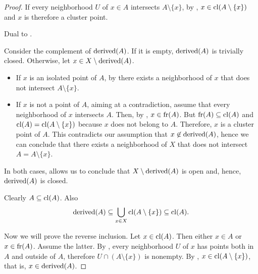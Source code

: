 \begin{proof}
   If every neighborhood \( U \) of \( x \in A \) intersects \( A \setminus \{ x \} \), by , \( x \in \operatorname{cl}(A \setminus \{ x \}) \) and \( x \) is therefore a cluster point.

   Dual to .

   Consider the complement of \( \operatorname{derived}(A) \). If it is empty, \( \operatorname{derived}(A) \) is trivially closed. Otherwise, let \( x \in X \setminus \operatorname{derived}(A) \).

  \begin{itemize}
    \item If \( x \) is an isolated point of \( A \), by  there exists a neighborhood of \( x \) that does not intersect \( A \setminus \{ x \} \).
    \item If \( x \) is not a point of \( A \), aiming at a contradiction, assume that every neighborhood of \( x \) intersects \( A \). Then, by , \( x \in \operatorname{fr}(A) \). But \( \operatorname{fr}(A) \subseteq \operatorname{cl}(A) \) and \( \operatorname{cl}(A) = \operatorname{cl}(A \setminus \{ x \}) \) because \( x \) does not belong to \( A \). Therefore, \( x \) is a cluster point of \( A \). This contradicts our assumption that \( x \not\in \operatorname{derived}(A) \), hence we can conclude that there exists a neighborhood of \( X \) that does not intersect \( A = A \setminus \{ x \} \).
  \end{itemize}

  In both cases,  allows us to conclude that \( X \setminus \operatorname{derived}(A) \) is open and, hence, \( \operatorname{derived}(A) \) is closed.

   Clearly \( A \subseteq \operatorname{cl}(A) \). Also
  \begin{equation*}
    \operatorname{derived}(A) \subseteq \bigcup_{x \in X} \operatorname{cl}(A \setminus \{ x \}) \subseteq \operatorname{cl}(A).
  \end{equation*}

  Now we will prove the reverse inclusion. Let \( x \in \operatorname{cl}(A) \). Then either \( x \in A \) or \( x \in \operatorname{fr}(A) \). Assume the latter. By , every neighborhood \( U \) of \( x \) has points both in \( A \) and outside of \( A \), therefore \( U \cap (A \setminus \{ x \}) \) is nonempty. By , \( x \in \operatorname{cl}(A \setminus \{ x \}) \), that is, \( x \in \operatorname{derived}(A) \).


\end{proof}
